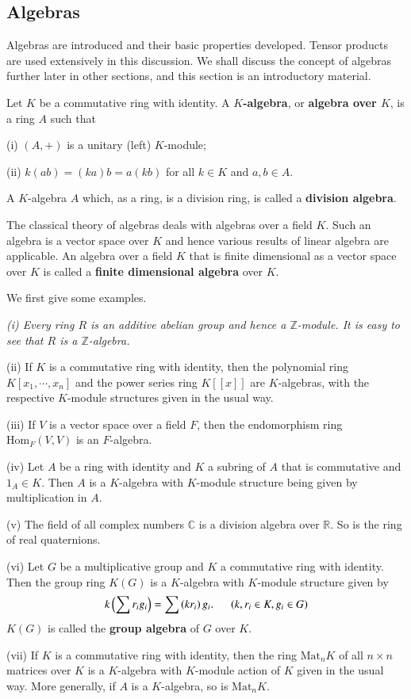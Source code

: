 \subsection{Algebras}
Algebras are introduced and their basic properties developed. Tensor products are used extensively in this discussion. We shall discuss the concept of algebras further later in other sections, and this section is an introductory material.
\begin{definition}
Let $K$ be a commutative ring with identity. A \textbf{$K$-algebra}, or \textbf{algebra over $K$}, is a ring $A$ such that \par
(i) $(A,+)$ is a unitary (left) $K$-module;\par
(ii) $k(ab)=(ka)b=a(kb)$ for all $k\in K$ and $a,b\in A$.\par
A $K$-algebra $A$ which, as a ring, is a division ring, is called a \textbf{division algebra}.
\end{definition}
The classical theory of algebras deals with algebras over a field $K$. Such an algebra is a vector space over $K$ and hence various results of linear algebra are applicable. An algebra over a field $K$ that is finite dimensional as a vector space over $K$ is called a \textbf{finite dimensional algebra} over $K$.\par
We first give some examples.
\begin{example}\em
(i) Every ring $R$ is an additive abelian group and hence a $\mathbb{Z}$-module. It is easy to see that $R$ is a $\mathbb{Z}$-algebra.\par
(ii) If $K$ is a commutative ring with identity, then the polynomial ring $K[x_1,\cdots,x_n]$ and the power series ring $K[[x]]$ are $K$-algebras, with the respective $K$-module structures given in the usual way.\par
(iii) If $V$ is a vector space over a field $F$, then the endomorphism ring $\mathrm{Hom}_F(V,V)$ is an $F$-algebra.\par
(iv) Let $A$ be a ring with identity and $K$ a subring of $A$ that is commutative and $1_A\in K$. Then $A$ is a $K$-algebra with $K$-module structure being given by multiplication in $A$.\par
(v) The field of all complex numbers $\mathbb{C}$ is a division algebra over $\mathbb{R}$. So is the ring of real quaternions.\par
(vi) Let $G$ be a multiplicative group and $K$ a commutative ring with identity. Then the group ring $K(G)$ is a $K$-algebra with $K$-module structure given by 
$$
k\left( \sum{r_ig_i} \right) =\sum{\left( kr_i \right) g_i}.\hspace{0.5cm}\left( k,r_i\in K,g_i\in G \right) 
$$
$K(G)$ is called the \textbf{group algebra} of $G$ over $K$.\par
(vii) If $K$ is a commutative ring with identity, then the ring $\mathrm{Mat}_nK$ of all $n\times n$ matrices over $K$ is a $K$-algebra with $K$-module action of $K$ given in the usual way. More generally, if $A$ is a $K$-algebra, so is $\mathrm{Mat}_nK$.
\end{example}
